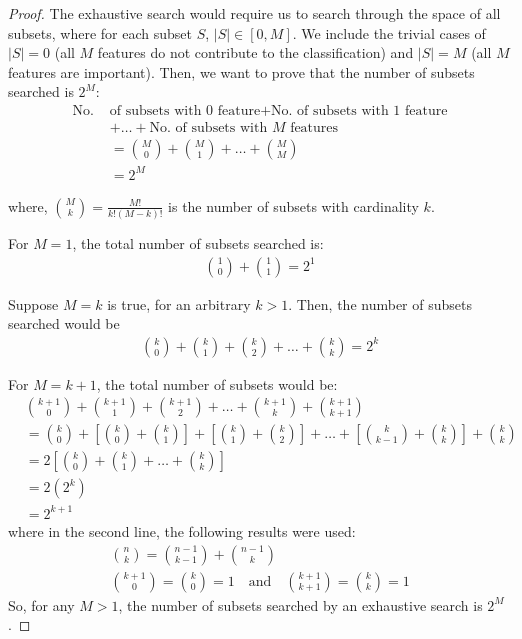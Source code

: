 \documentclass[12pt, twoside, a4paper]{report}
\begin{document}
\begin{proof}
The exhaustive search would require us to search through the space of all subsets, where for each subset $S$, $|S| \in \left[ 0, M \right]$. We include the trivial cases of $|S|=0$ (all $M$ features do not contribute to the classification) and $|S|=M$ (all $M$ features are important). Then, we want to prove that the number of subsets searched is $2^M$:
\begin{align*}
\text{No. } &\text{of subsets with 0 feature} + \text{No. of subsets with 1 feature} \\ & + \dots + \text{No. of subsets with $M$ features} \\
&= {{M}\choose{0}} + {{M}\choose{1}} + \dots + {{M}\choose{M}} \\
&= 2^M
\end{align*}

where, ${{M}\choose{k}} = \frac{M!}{k!(M-k)!}$ is the number of subsets with cardinality $k$. 

For $M=1$, the total number of subsets searched is:
\begin{align*}
{{1}\choose{0}} + {{1}\choose{1}} = 2^1
\end{align*}

Suppose $M=k$ is true, for an arbitrary $k>1$. Then, the number of subsets searched would be
\begin{align*}
{{k}\choose{0}} + {{k}\choose{1}} + {{k}\choose{2}} + \dots + {{k}\choose{k}} = 2^k 
\end{align*}

For $M=k+1$, the total number of subsets would be:
\begin{align*}
&{{k+1}\choose{0}} + {{k+1}\choose{1}} + {{k+1}\choose{2}} + \dots + {{k+1}\choose{k}} + {{k+1}\choose{k+1}} \\
&= {{k}\choose{0}} + \left[ {{k}\choose{0}} + {{k}\choose{1}} \right] + \left[ {{k}\choose{1}} + {{k}\choose{2}} \right] + \dots + \left[ {{k}\choose{k-1}} + {{k}\choose{k}} \right] + {{k}\choose{k}} \\
&= 2 \left[ {{k}\choose{0}} + {{k}\choose{1}} + \dots + {{k}\choose{k}} \right] \\
&= 2 \left(2^k \right) \\
&= 2^{k+1}
\end{align*}
where in the second line, the following results were used:
\begin{gather*}
{{n}\choose{k}} = {{n-1}\choose{k-1}} + {{n-1}\choose{k}} \\[1em]
{{k+1}\choose{0}} = {{k}\choose{0}} = 1 \quad \text{and} \quad {{k+1}\choose{k+1}} = {{k}\choose{k}} = 1
\end{gather*}
So, for any $M>1$, the number of subsets searched by an exhaustive search is $2^M$.
\end{proof}
\end{document}
